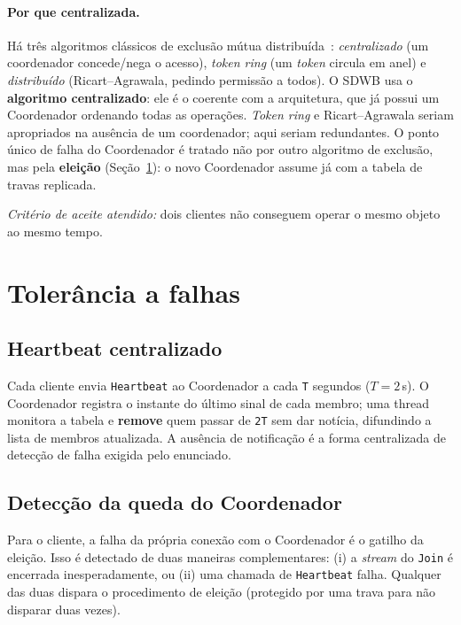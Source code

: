 \paragraph{Por que centralizada.} Há três algoritmos clássicos de exclusão mútua
distribuída~\citep{tanenbaum}: \emph{centralizado} (um coordenador concede/nega o acesso),
\emph{token ring} (um \emph{token} circula em anel) e \emph{distribuído}
(Ricart--Agrawala, pedindo permissão a todos). O SDWB usa o \textbf{algoritmo
centralizado}: ele é o coerente com a arquitetura, que já possui um Coordenador ordenando
todas as operações. \emph{Token ring} e Ricart--Agrawala seriam apropriados na ausência de
um coordenador; aqui seriam redundantes. O ponto único de falha do Coordenador é tratado
não por outro algoritmo de exclusão, mas pela \textbf{eleição}
(Seção~\ref{sec:tolerancia}): o novo Coordenador assume já com a tabela de travas
replicada.

\emph{Critério de aceite atendido:} dois clientes não conseguem operar o mesmo objeto ao
mesmo tempo.

\section{Tolerância a falhas}
\label{sec:tolerancia}

\subsection{Heartbeat centralizado}

Cada cliente envia \texttt{Heartbeat} ao Coordenador a cada \texttt{T} segundos
($T = 2$\,s). O Coordenador registra o instante do último sinal de cada membro; uma thread
monitora a tabela e \textbf{remove} quem passar de \texttt{2T} sem dar notícia, difundindo
a lista de membros atualizada. A ausência de notificação é a forma centralizada de detecção
de falha exigida pelo enunciado.

\subsection{Detecção da queda do Coordenador}

Para o cliente, a falha da própria conexão com o Coordenador é o gatilho da eleição. Isso é
detectado de duas maneiras complementares: (i) a \emph{stream} do \texttt{Join} é encerrada
inesperadamente, ou (ii) uma chamada de \texttt{Heartbeat} falha. Qualquer das duas dispara
o procedimento de eleição (protegido por uma trava para não disparar duas vezes).

